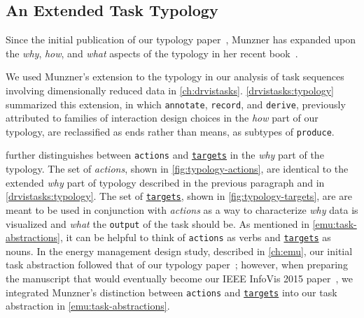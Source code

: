 \subsection{An Extended Task Typology}
\label{conclusions:typology:extension}


Since the initial publication of our typology paper~\cite{Brehmer2013}, Munzner has expanded upon the {\it why}, {\it how}, and {\it what} aspects of the typology in her recent book~\cite{Munzner2014}.

We used Munzner's extension to the typology in our analysis of task sequences involving dimensionally reduced data in \autoref{ch:drvistasks}.
\autoref{drvistasks:typology} summarized this extension, in which {\tt annotate}, {\tt record}, and {\tt derive}, previously attributed to families of interaction design choices in the {\it how} part of our typology, are reclassified as ends rather than means, as subtypes of {\tt produce}.

\citet{Munzner2014} further distinguishes between {\tt actions} and \underline{{\tt targets}} in the {\it why} part of the typology.
The set of {\it actions}, shown in \autoref{fig:typology-actions}, are identical to the extended {\it why} part of typology described in the previous paragraph and in \autoref{drvistasks:typology}.
The set of \underline{{\tt targets}}, shown in \autoref{fig:typology-targets}, are are meant to be used in conjunction with {\it actions} as a way to characterize {\it why} data is visualized and {\it what} the {\tt output} of the task should be.
As mentioned in \autoref{emu:task-abstractions}, it can be helpful to think of {\tt actions} as verbs and \underline{{\tt targets}} as nouns.
In the energy management design study, described in \autoref{ch:emu}, our initial task abstraction followed that of our typology paper~\cite{Brehmer2013}; however, when preparing the manuscript that would eventually become our IEEE InfoVis 2015 paper~\cite{Brehmer2015}, we integrated Munzner's distinction between {\tt actions} and \underline{{\tt targets}} into our task abstraction in \autoref{emu:task-abstractions}.

